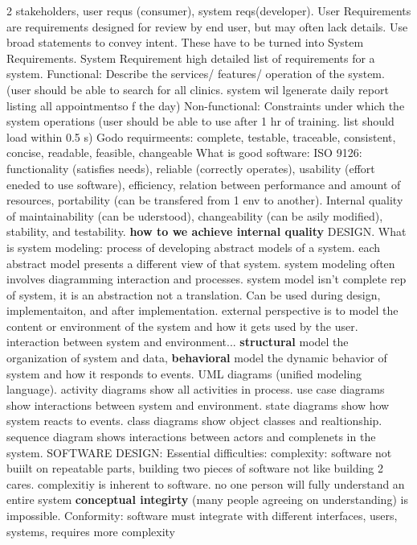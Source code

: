 \documentclass[10pt]{article}
\begin{document}
\begin{landscape}
\begin{multicols*}{6}
2 stakeholders, user requs (consumer), system reqs(developer). User Requirements are requirements designed
for review by end user, but may often lack details. Use broad statements to convey intent. These have to be turned into System Requirements. System Requirement high detailed list of requirements for a system.
Functional: Describe the services/ features/ operation of the system. (user should be able to search for all clinics. system wil lgenerate daily report listing all appointmentso f the day)
Non-functional: Constraints under which the system operations (user should be able to use after 1 hr of training. list should load within 0.5 s)
Godo requirmeents: complete, testable, traceable, consistent, concise, readable, feasible, changeable
What is good software: ISO 9126: functionality (satisfies needs), reliable (correctly operates), usability (effort eneded to use software), efficiency, relation between performance and amount of resources, portability (can be transfered from 1 env to another). Internal quality of maintainability (can be uderstood), changeability (can be asily modified), stability, and testability. \textbf{how to we achieve internal quality} DESIGN.
What is system modeling: process of developing abstract models of a system. each abstract model presents a different view of that system. system modeling often involves diagramming interaction and processes. system model isn't complete rep of system, it is an abstraction not a translation. Can be used during design, implementaiton, and after implementation. external perspective is to model the content or environment of the system and how it gets used by the user. interaction between system and environment... \textbf{structural} model the organization of system and data, \textbf{behavioral} model the dynamic behavior of system and how it responds to events.
UML diagrams (unified modeling language). activity diagrams show all activities in process. use case diagrams show interactions between system and environment. state diagrams show how system reacts to events. class diagrams show object classes and realtionship. sequence diagram shows interactions between actors and complenets in the system. 
SOFTWARE DESIGN:
Essential difficulties: complexity: software not buiilt on repeatable parts, building two pieces of software not like building 2 cares. complexitiy is inherent to software. no one person will fully understand an entire system \textbf{conceptual integirty} (many people agreeing on understanding) is impossible.
Conformity: software must integrate with different interfaces, users, systems, requires more complexity

\end{multicols*}
\end{landscape}
\end{document}
